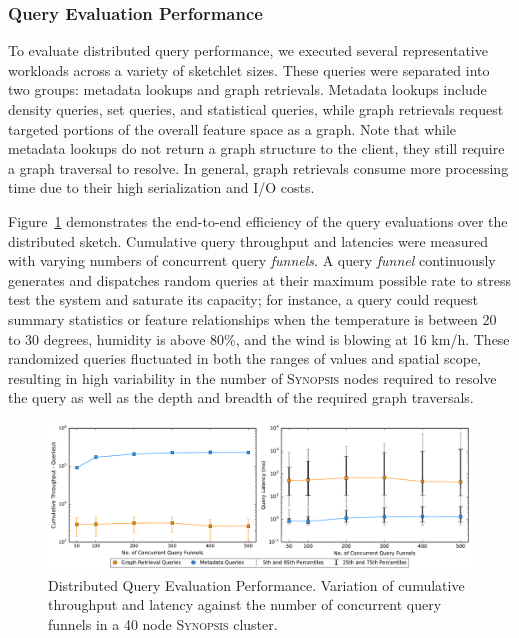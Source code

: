 \subsubsection{Query Evaluation Performance}
To evaluate distributed query performance, we executed several representative workloads across a variety of sketchlet sizes. These queries were separated into two groups: metadata lookups and graph retrievals. Metadata lookups include density queries, set queries, and statistical queries, while graph retrievals request targeted portions of the overall feature space as a graph.  Note that while metadata lookups do not return a graph structure to the client, they still require a graph traversal to resolve. In general, graph retrievals consume more processing time due to their high serialization and I/O costs.

Figure~\ref{fig:dist-query} demonstrates the end-to-end efficiency of the query evaluations over the distributed sketch.
Cumulative query throughput and latencies were measured with varying numbers of concurrent query \emph{funnels}.
A query \emph{funnel} continuously generates and dispatches random queries at their maximum possible rate to stress test the system and saturate its capacity; for instance, a query could request summary statistics or feature relationships when the temperature is between 20 to 30 degrees, humidity is above 80\%, and the wind is blowing at 16 km/h.
These randomized queries fluctuated in both the ranges of values and spatial scope, resulting in high variability in the number of \textsc{Synopsis} nodes required to resolve the query as well as the depth and breadth of the required graph traversals.

\begin{figure}
    \centerline{\includegraphics[width=\linewidth]{figures/query_benchmark_both.pdf}}
    \caption{Distributed Query Evaluation Performance. Variation of cumulative throughput and latency against the number of concurrent query funnels in a 40 node \textsc{Synopsis} cluster.}
    \label{fig:dist-query}
\end{figure}

